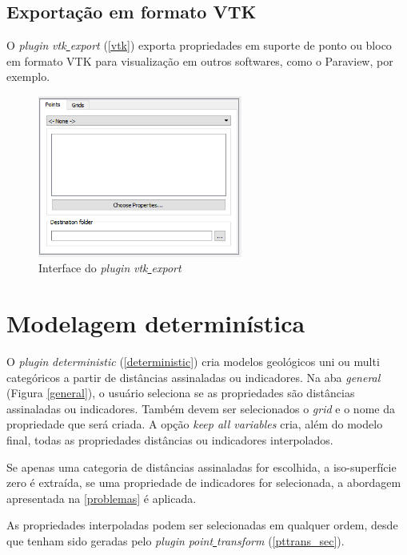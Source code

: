 \subsection{Exportação em formato VTK}

O \textit{plugin} \textit{vtk\underline{ }export} (\autoref{vtk}) exporta propriedades em suporte de ponto ou bloco em formato VTK para visualização em outros softwares, como o Paraview, por exemplo.

\begin{figure}[H]
	\caption{\label{vtk}Interface do \textit{plugin} \textit{vtk\underline{ }export}}
	\centering
		\includegraphics[width=0.6\textwidth]{apendice_a/imagens/vtk_export_1.PNG}
\end{figure}

\section{Modelagem determinística}

O \textit{plugin} \textit{deterministic} (\autoref{deterministic}) cria modelos geológicos uni ou multi categóricos a partir de distâncias assinaladas ou indicadores. Na aba \textit{general} (Figura \autoref{general}), o usuário seleciona se as propriedades são distâncias assinaladas ou indicadores. Também devem ser selecionados o \textit{grid} e o nome da propriedade que será criada. A opção \textit{keep all variables} cria, além do modelo final, todas as propriedades distâncias ou indicadores interpolados.

Se apenas uma categoria de distâncias assinaladas for escolhida, a iso-superfície zero é extraída, se uma propriedade de indicadores for selecionada, a abordagem apresentada na \autoref{problemas} é aplicada.
 
As propriedades interpoladas podem ser selecionadas em qualquer ordem, desde que tenham sido geradas pelo \textit{plugin} \textit{point\underline{ }transform} (\autoref{pttrans_sec}).

